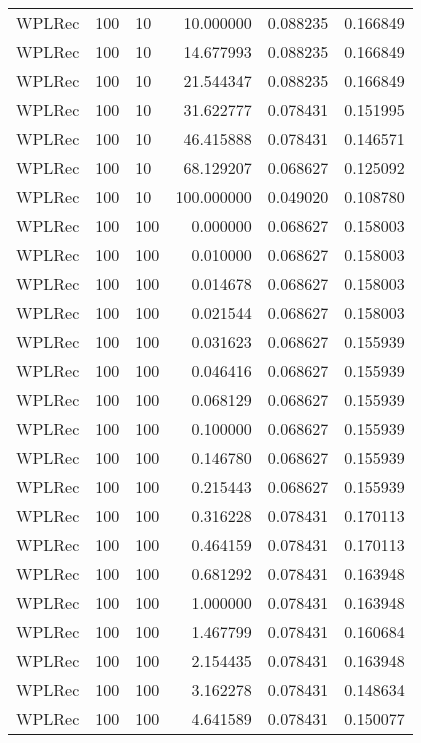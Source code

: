 \begin{tabular}{lllrrr}
 WPLRec &  100 &     10 &   10.000000 &     0.088235 &  0.166849 \\
 WPLRec &  100 &     10 &   14.677993 &     0.088235 &  0.166849 \\
 WPLRec &  100 &     10 &   21.544347 &     0.088235 &  0.166849 \\
 WPLRec &  100 &     10 &   31.622777 &     0.078431 &  0.151995 \\
 WPLRec &  100 &     10 &   46.415888 &     0.078431 &  0.146571 \\
 WPLRec &  100 &     10 &   68.129207 &     0.068627 &  0.125092 \\
 WPLRec &  100 &     10 &  100.000000 &     0.049020 &  0.108780 \\
 WPLRec &  100 &    100 &    0.000000 &     0.068627 &  0.158003 \\
 WPLRec &  100 &    100 &    0.010000 &     0.068627 &  0.158003 \\
 WPLRec &  100 &    100 &    0.014678 &     0.068627 &  0.158003 \\
 WPLRec &  100 &    100 &    0.021544 &     0.068627 &  0.158003 \\
 WPLRec &  100 &    100 &    0.031623 &     0.068627 &  0.155939 \\
 WPLRec &  100 &    100 &    0.046416 &     0.068627 &  0.155939 \\
 WPLRec &  100 &    100 &    0.068129 &     0.068627 &  0.155939 \\
 WPLRec &  100 &    100 &    0.100000 &     0.068627 &  0.155939 \\
 WPLRec &  100 &    100 &    0.146780 &     0.068627 &  0.155939 \\
 WPLRec &  100 &    100 &    0.215443 &     0.068627 &  0.155939 \\
 WPLRec &  100 &    100 &    0.316228 &     0.078431 &  0.170113 \\
 WPLRec &  100 &    100 &    0.464159 &     0.078431 &  0.170113 \\
 WPLRec &  100 &    100 &    0.681292 &     0.078431 &  0.163948 \\
 WPLRec &  100 &    100 &    1.000000 &     0.078431 &  0.163948 \\
 WPLRec &  100 &    100 &    1.467799 &     0.078431 &  0.160684 \\
 WPLRec &  100 &    100 &    2.154435 &     0.078431 &  0.163948 \\
 WPLRec &  100 &    100 &    3.162278 &     0.078431 &  0.148634 \\
 WPLRec &  100 &    100 &    4.641589 &     0.078431 &  0.150077 \\

\end{tabular}
